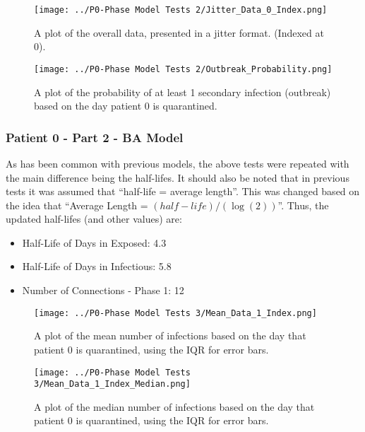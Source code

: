 \documentclass{article}
\numberwithin{equation}{section} %
\begin{document}
\begin{figure}[H]
  \centering
  \texttt{[image: ../P0-Phase Model Tests 2/Jitter\_Data\_0\_Index.png]}
  \caption{A plot of the overall data, presented in a jitter format. (Indexed at 0).}
\end{figure}

\begin{figure}[H]
  \centering
  \texttt{[image: ../P0-Phase Model Tests 2/Outbreak\_Probability.png]}
  \caption{A plot of the probability of at least 1 secondary infection (outbreak) based on the day patient 0 is quarantined.}
\end{figure}

\begin{multicols}{2}
  \subsubsection{Patient 0 - Part 2 - BA Model}
  \label{Phase Model: Patient 0 - Part 2}
  As has been common with previous models, the above tests were repeated with the main difference being the half-lifes. It should also be noted that in previous tests it was assumed that ``half-life = average length''.  This was changed based on the idea that ``Average Length = $(half-life)/(\log(2))$''. Thus, the updated half-lifes (and other values) are: \\
  \begin{itemize}
  \item Half-Life of Days in Exposed: 4.3
  \item Half-Life of Days in Infectious: 5.8
  \item Number of Connections - Phase 1: 12
  \end{itemize}
\end{multicols}

\begin{figure}[H]
  \centering
  \texttt{[image: ../P0-Phase Model Tests 3/Mean\_Data\_1\_Index.png]}
  \caption{A plot of the mean number of infections based on the day that patient 0 is quarantined, using the IQR for error bars.}
\end{figure}

\begin{figure}[H]
  \centering
  \texttt{[image: ../P0-Phase Model Tests 3/Mean\_Data\_1\_Index\_Median.png]}
  \caption{A plot of the median number of infections based on the day that patient 0 is quarantined, using the IQR for error bars.}
\end{figure}
\end{document}
